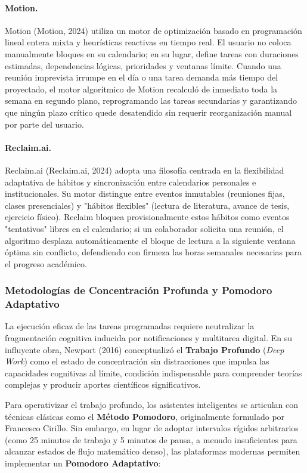 \paragraph{Motion.}
Motion (Motion, 2024) utiliza un motor de optimización basado en programación lineal entera mixta y heurísticas reactivas en tiempo real. El usuario no coloca manualmente bloques en su calendario; en su lugar, define tareas con duraciones estimadas, dependencias lógicas, prioridades y ventanas límite. Cuando una reunión imprevista irrumpe en el día o una tarea demanda más tiempo del proyectado, el motor algorítmico de Motion recalculó de inmediato toda la semana en segundo plano, reprogramando las tareas secundarias y garantizando que ningún plazo crítico quede desatendido sin requerir reorganización manual por parte del usuario.

\paragraph{Reclaim.ai.}
Reclaim.ai (Reclaim.ai, 2024) adopta una filosofía centrada en la flexibilidad adaptativa de hábitos y sincronización entre calendarios personales e institucionales. Su motor distingue entre eventos inmutables (reuniones fijas, clases presenciales) y "hábitos flexibles" (lectura de literatura, avance de tesis, ejercicio físico). Reclaim bloquea provisionalmente estos hábitos como eventos "tentativos" libres en el calendario; si un colaborador solicita una reunión, el algoritmo desplaza automáticamente el bloque de lectura a la siguiente ventana óptima sin conflicto, defendiendo con firmeza las horas semanales necesarias para el progreso académico.

\subsubsection{Metodologías de Concentración Profunda y Pomodoro Adaptativo}

La ejecución eficaz de las tareas programadas requiere neutralizar la fragmentación cognitiva inducida por notificaciones y multitarea digital. En su influyente obra, Newport (2016) conceptualizó el \textbf{Trabajo Profundo} (\textit{Deep Work}) como el estado de concentración sin distracciones que impulsa las capacidades cognitivas al límite, condición indispensable para comprender teorías complejas y producir aportes científicos significativos.

Para operativizar el trabajo profundo, los asistentes inteligentes se articulan con técnicas clásicas como el \textbf{Método Pomodoro}, originalmente formulado por Francesco Cirillo. Sin embargo, en lugar de adoptar intervalos rígidos arbitrarios (como 25 minutos de trabajo y 5 minutos de pausa, a menudo insuficientes para alcanzar estados de flujo matemático denso), las plataformas modernas permiten implementar un \textbf{Pomodoro Adaptativo}:


